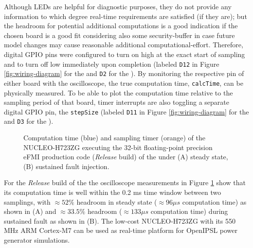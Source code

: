 Although LEDs are helpful for diagnostic purposes, they do not provide any information to which degree real-time requirements are satisfied (if they are); but the headroom for potential additional computations is a good indication if the chosen board is a good fit considering also some security-buffer in case future model changes may cause reasonable additional computational-effort. Therefore, digital GPIO pins were configured to turn on high at the exact start of sampling and to turn off low immediately upon completion (labeled \texttt{D12} in Figure \ref{fig:wiring-diagram} for the \controller{} and \texttt{D2} for the \plant{}). By monitoring the respective pin of either board with the oscilloscope, the true computation time, \texttt{calcTime}, can be physically measured. To be able to plot the computation time relative to the sampling period of that board, timer interrupts are also toggling a separate digital GPIO pin, the \texttt{stepSize} (labeled \texttt{D11} in Figure \ref{fig:wiring-diagram} for the \controller{} and \texttt{D3} for the \plant{}).

\begin{figure}[t!]
    \centerline{}
    \vspace{-2ex}
    \caption{Computation time (blue) and sampling timer (orange) of the NUCLEO-H723ZG executing the 32-bit floating-point precision eFMI production code (\textit{Release} build) of the \plant{} under (A) steady state, (B) sustained fault injection.}
    \label{fig:calc-time}
    \vspace{-2ex}
\end{figure}


For the \textit{Release} build of the \plant{} the oscilloscope measurements in Figure \ref{fig:calc-time} show that its computation time is well within the 0.2 ms time window between two samplings, with ${\approx}52\%$ headroom in steady state (${\approx}96\mu{}s$ computation time) as shown in (A) and ${\approx}33.5\%$ headroom (${\approx}133\mu{}s$ computation time) during sustained fault as shown in (B). The low-cost NUCLEO-H723ZG with its 550 MHz ARM Cortex-M7 can be used as real-time platform for OpenIPSL power generator simulations.

